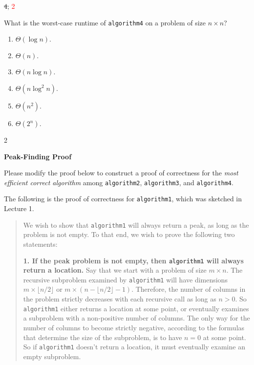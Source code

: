 \documentclass[12pt,twoside]{article}
\begin{document}
\begin{problems}
\begin{problemparts}
        \ifsolution \solution{}
            \sout{4}; \textcolor{red}{2}
        \fi

        \problempart {} What is the worst-case runtime of \texttt{algorithm4} on a problem of size $n \times n$?
        \begin{enumerate}
            \item $\Theta(\log n)$.
            \item $\Theta(n)$.
            \item $\Theta(n \log n)$.
            \item $\Theta(n \log^2 n)$.
            \item $\Theta(n^2)$.
            \item $\Theta(2^n)$.
        \end{enumerate}

        \ifsolution \solution{}
            2
        \fi

    \end{problemparts}

    \problem {} \textbf{Peak-Finding Proof}

    Please modify the proof below to construct a proof of correctness for the
    \emph{most efficient correct algorithm} among \texttt{algorithm2},
    \texttt{algorithm3}, and \texttt{algorithm4}.

    The following is the proof of correctness for \texttt{algorithm1}, which was
    sketched in Lecture 1.

    \begin{quote}
        We wish to show that \texttt{algorithm1}
        will always return a peak,
        as long as the problem is not empty.
        To that end,
        we wish to prove the following two statements:

        {\bf 1. If the peak problem is not empty,
        then \texttt{algorithm1} will always return a location.}
        Say that we start with a problem of size $m \times n$.
        The recursive subproblem examined by \texttt{algorithm1}
        will have dimensions
        $m \times \lfloor n / 2 \rfloor$ or 
        $m \times \left(n - \lfloor n / 2 \rfloor - 1 \right)$.
        Therefore, the number of columns in the problem
        strictly decreases with each recursive call
        as long as $n > 0$.
        So \texttt{algorithm1} either returns a location at some point,
        or eventually examines a subproblem with a non-positive
        number of columns.
        The only way for the number of columns to become strictly negative,
        according to the formulas that determine the size of the subproblem,
        is to have $n = 0$ at some point.
        So if \texttt{algorithm1} doesn't return a location,
        it must eventually examine an empty subproblem.


\end{quote}
\end{problems}
\end{document}
